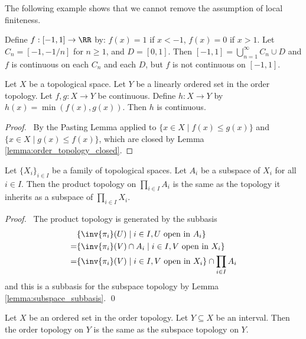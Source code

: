 The following example shows that we cannot remove the assumption of local finiteness.

\begin{example}
    Define $f : [-1,1] \rightarrow \RR$ by: $f(x) = 1$ if $x < -1$, $f(x) = 0$ if $x > 1$. Let $C_n = [-1,-1/n]$ for $n \geq 1$, and $D = [0,1]$. Then
    $[-1,1] = \bigcup_{n=1}^\infty C_n \cup D$ and $f$ is continuous on each $C_n$ and each $D$, but $f$ is not continuous on $[-1,1]$.    
\end{example}

\begin{proposition}
    Let $X$ be a topological space.
    Let $Y$ be a linearly ordered set in the order topology. Let $f, g : X \rightarrow Y$ be continuous. Define $h : X \rightarrow Y$ by $h(x) = \min(f(x),g(x))$.
    Then $h$ is continuous.
\end{proposition}

\begin{proof}
    \pf\ By the Pasting Lemma applied to $\{ x \in X \mid f(x) \leq g(x) \}$ and $\{ x \in X \mid g(x) \leq f(x) \}$, which are closed by Lemma \ref{lemma:order_topology_closed}.
\end{proof}

\begin{theorem}
    Let $\{ X_i \}_{i \in I}$ be a family of topological spaces. Let $A_i$ be a subspace of $X_i$ for all $i \in I$.
    Then the product topology on $\prod_{i \in I} A_i$ is the same as the topology it inherits as a subspace of
    $\prod_{i \in I} X_i$.
\end{theorem}

\begin{proof}
    \pf\ The product topology is generated by the subbasis
    \begin{align*}
        & \{ \inv{\pi_i}(U) \mid i \in I, U \text{ open in } A_i \} \\
        = & \{ \inv{\pi_i}(V) \cap A_i \mid i \in I, V \text{ open in } X_i \} \\
        = & \{ \inv{\pi_i}(V) \mid i \in I, V \text{ open in } X_i \} \cap \prod_{i \in I} A_i
    \end{align*}
    and this is a subbasis for the subspace topology by Lemma \ref{lemma:subspace_subbasis}. \qed
\end{proof}

\begin{theorem}
    Let $X$ be an ordered set in the order topology. Let $Y \subseteq X$ be an interval. Then the order topology
    on $Y$ is the same as the subspace topology on $Y$.
\end{theorem}

